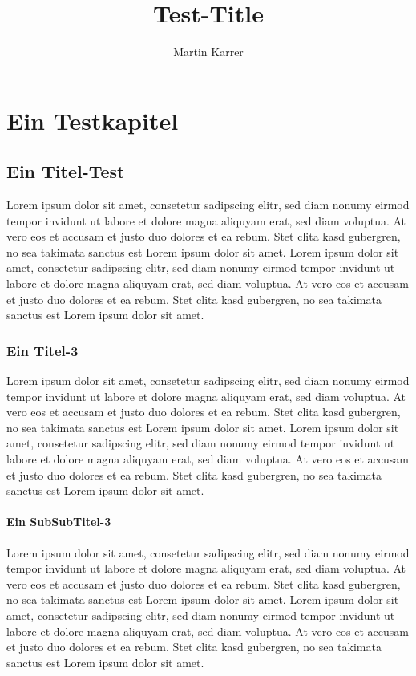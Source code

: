 \documentclass[10pt,a4paper]{report}
\author{Martin Karrer}
\title{Test-Title}
\begin{document}
\maketitle

 \newpage
\chapter{Ein Testkapitel}
\section{Ein Titel-Test}
Lorem ipsum dolor sit amet, consetetur sadipscing elitr, sed diam nonumy eirmod tempor invidunt ut labore et dolore magna aliquyam erat, sed diam voluptua. At vero eos et accusam et justo duo dolores et ea rebum. Stet clita kasd gubergren, no sea takimata sanctus est Lorem ipsum dolor sit amet. Lorem ipsum dolor sit amet, consetetur sadipscing elitr, sed diam nonumy eirmod tempor invidunt ut labore et dolore magna aliquyam erat, sed diam voluptua. At vero eos et accusam et justo duo dolores et ea rebum. Stet clita kasd gubergren, no sea takimata sanctus est Lorem ipsum dolor sit amet.
\subsection{Ein Titel-3}
Lorem ipsum dolor sit amet, consetetur sadipscing elitr, sed diam nonumy eirmod tempor invidunt ut labore et dolore magna aliquyam erat, sed diam voluptua. At vero eos et accusam et justo duo dolores et ea rebum. Stet clita kasd gubergren, no sea takimata sanctus est Lorem ipsum dolor sit amet. Lorem ipsum dolor sit amet, consetetur sadipscing elitr, sed diam nonumy eirmod tempor invidunt ut labore et dolore magna aliquyam erat, sed diam voluptua. At vero eos et accusam et justo duo dolores et ea rebum. Stet clita kasd gubergren, no sea takimata sanctus est Lorem ipsum dolor sit amet.
\subsubsection{Ein SubSubTitel-3}
Lorem ipsum dolor sit amet, consetetur sadipscing elitr, sed diam nonumy eirmod tempor invidunt ut labore et dolore magna aliquyam erat, sed diam voluptua. At vero eos et accusam et justo duo dolores et ea rebum. Stet clita kasd gubergren, no sea takimata sanctus est Lorem ipsum dolor sit amet. Lorem ipsum dolor sit amet, consetetur sadipscing elitr, sed diam nonumy eirmod tempor invidunt ut labore et dolore magna aliquyam erat, sed diam voluptua. At vero eos et accusam et justo duo dolores et ea rebum. Stet clita kasd gubergren, no sea takimata sanctus est Lorem ipsum dolor sit amet.
\end{document}
